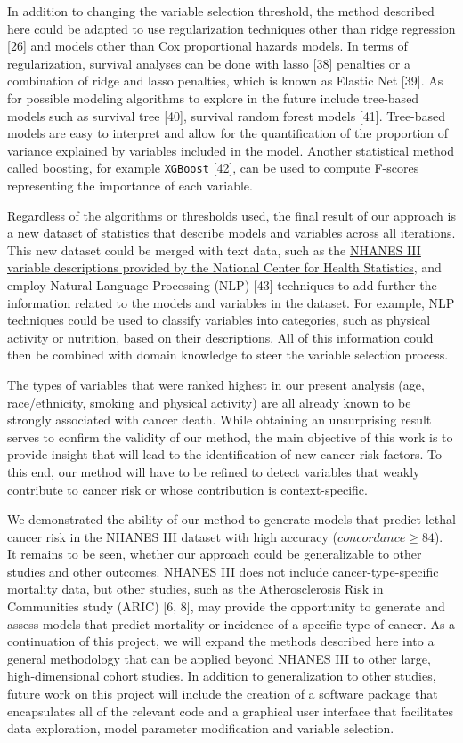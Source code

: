 \documentclass[12pt,oneside]{reedthesis}
\theoremstyle{definition}
\theoremstyle{definition}
\theoremstyle{definition}
\theoremstyle{remark}
\begin{document}
In addition to changing the variable selection threshold, the method
described here could be adapted to use regularization techniques other
than ridge regression {[}26{]} and models other than Cox proportional
hazards models. In terms of regularization, survival analyses can be
done with lasso {[}38{]} penalties or a combination of ridge and lasso
penalties, which is known as Elastic Net {[}39{]}. As for possible
modeling algorithms to explore in the future include tree-based models
such as survival tree {[}40{]}, survival random forest models {[}41{]}.
Tree-based models are easy to interpret and allow for the quantification
of the proportion of variance explained by variables included in the
model. Another statistical method called boosting, for example
\texttt{XGBoost} {[}42{]}, can be used to compute F-scores representing
the importance of each variable.

Regardless of the algorithms or thresholds used, the final result of our
approach is a new dataset of statistics that describe models and
variables across all iterations. This new dataset could be merged with
text data, such as the
\href{https://wwwn.cdc.gov/nchs/nhanes/nhanes3/DataFiles.aspx}{NHANES
III variable descriptions provided by the National Center for Health
Statistics}, and employ Natural Language Processing (NLP) {[}43{]}
techniques to add further the information related to the models and
variables in the dataset. For example, NLP techniques could be used to
classify variables into categories, such as physical activity or
nutrition, based on their descriptions. All of this information could
then be combined with domain knowledge to steer the variable selection
process.

The types of variables that were ranked highest in our present analysis
(age, race/ethnicity, smoking and physical activity) are all already
known to be strongly associated with cancer death. While obtaining an
unsurprising result serves to confirm the validity of our method, the
main objective of this work is to provide insight that will lead to the
identification of new cancer risk factors. To this end, our method will
have to be refined to detect variables that weakly contribute to cancer
risk or whose contribution is context-specific.

We demonstrated the ability of our method to generate models that
predict lethal cancer risk in the NHANES III dataset with high accuracy
(\(concordance \geq 84\)). It remains to be seen, whether our approach
could be generalizable to other studies and other outcomes. NHANES III
does not include cancer-type-specific mortality data, but other studies,
such as the Atherosclerosis Risk in Communities study (ARIC) {[}6, 8{]},
may provide the opportunity to generate and assess models that predict
mortality or incidence of a specific type of cancer. As a continuation
of this project, we will expand the methods described here into a
general methodology that can be applied beyond NHANES III to other
large, high-dimensional cohort studies. In addition to generalization to
other studies, future work on this project will include the creation of
a software package that encapsulates all of the relevant code and a
graphical user interface that facilitates data exploration, model
parameter modification and variable selection.
\end{document}
